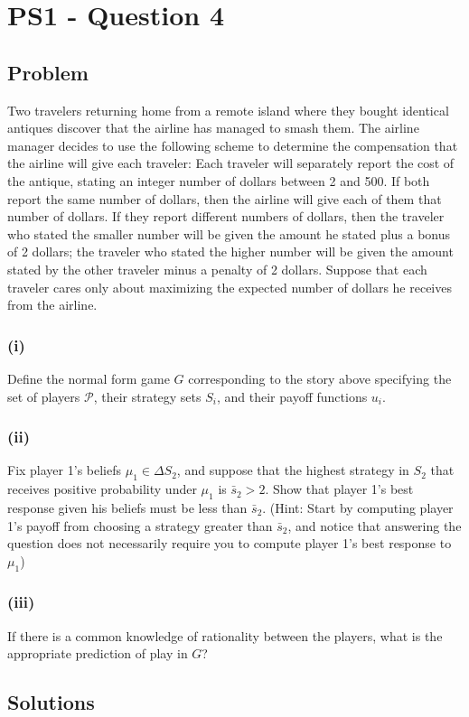 \documentclass[10pt, a4paper]{article}
\begin{document}
\section*{PS1 - Question 4}
  \subsection*{Problem}
    Two travelers returning home from a remote island where they bought identical antiques discover that the airline has managed to smash them. The airline manager decides to use the following scheme to determine the compensation that the airline will give each traveler: Each traveler will separately report the cost of the antique, stating an integer number of dollars between 2 and 500. If both report the same number of dollars, then the airline will give each of them that number of dollars. If they report different numbers of dollars, then the traveler who stated the smaller number will be given the amount he stated plus a bonus of 2 dollars; the traveler who stated the higher number will be given the amount stated by the other traveler minus a penalty of 2 dollars. Suppose that each traveler cares only about maximizing the expected number of dollars he receives from the airline.
    \subsubsection*{(i)}
      Define the normal form game $G$ corresponding to the story above specifying the set of players $\mathcal{P}$, their strategy sets  $S_i$, and their payoff functions $u_i$.
    \subsubsection*{(ii)}
      Fix player 1's beliefs $\mu_1\in\Delta S_2$, and suppose that the highest strategy in $S_2$ that receives positive probability under $\mu_1$ is $\bar{s}_2>2$. Show that player 1's best response given his beliefs must be less than $\bar{s}_2$. (Hint: Start by computing player 1's payoff from choosing a strategy greater than $\bar{s}_2$, and notice that answering the question does not necessarily require you to compute player 1's best response to $\mu_1$)
    \subsubsection*{(iii)}
      If there is a common knowledge of rationality between the players, what is the appropriate prediction of play in $G$?
  \subsection*{Solutions}
\end{document}
